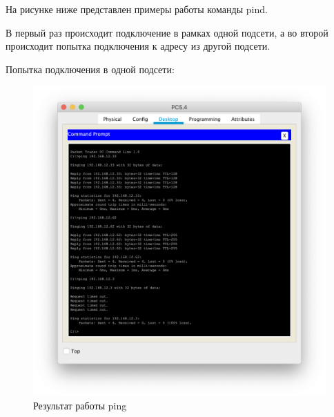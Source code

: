 На рисунке ниже представлен примеры работы команды pind.

В первый раз происходит подключение в рамках одной подсети, а во второй происходит попытка подключения к адресу из другой подсети.

Попытка подключения в одной подсети:
\begin{figure}[H]
    \centering
    \includegraphics[width=0.7\linewidth]{images/ping_1.png}
    \caption{Результат работы ping}%
\end{figure}

